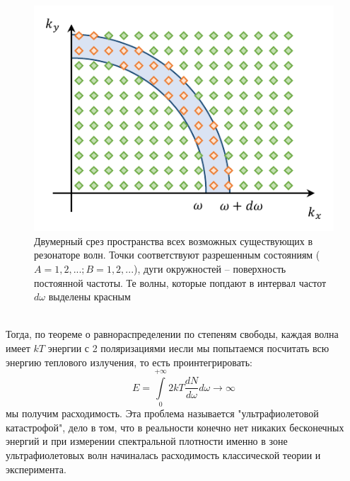 \documentclass[12pt]{article}
\begin{document}
\begin{figure}[h]
    \centering
    \includegraphics[scale=1.5]{Seminar_01/pics/pic_03.pdf}
    \caption{Двумерный срез пространства всех возможных существующих в резонаторе волн. Точки соответствуют разрешенным состояниям ($A=1, 2, ...; B = 1, 2, ...$), дуги окружностей -- поверхность постоянной частоты. Те волны, которые попдают в интервал частот $d\omega$ выделены красным}
    \label{fig:sem_01_dN_domega}
\end{figure}
\\
Тогда, по теореме о равнораспределении по степеням свободы, каждая волна имеет $kT$ энергии с 2 поляризациями иесли мы попытаемся посчитать всю энергию теплового излучения, то есть проинтегрировать: 
\begin{equation*}
    E = \int\limits_{0}^{+\infty} 2kT\dfrac{dN}{d\omega}d\omega \rightarrow \infty
\end{equation*}
мы получим расходимость. Эта проблема называется "ультрафиолетовой катастрофой", дело в том, что в реальности конечно нет никаких бесконечных энергий и при измерении спектральной плотности именно в зоне ультрафиолетовых волн начиналась расходимость классической теории и эксперимента.
\end{document}
